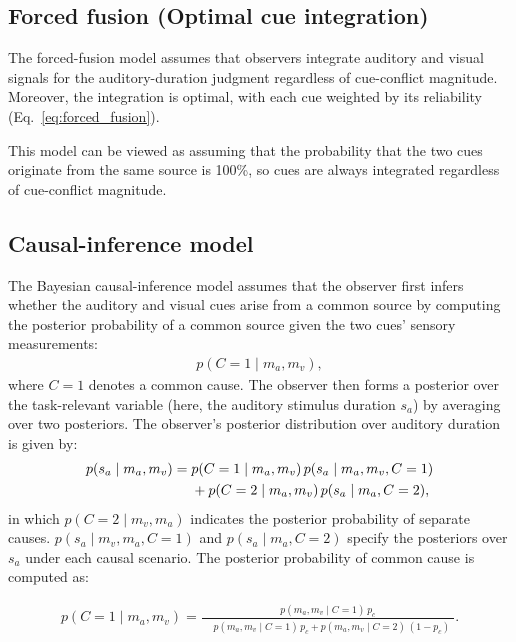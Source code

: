 \documentclass{biorxiv}
\begin{document}
\subsection{Forced fusion (Optimal cue integration)}
The forced-fusion model assumes that observers integrate auditory and visual signals for the auditory-duration judgment regardless of cue-conflict magnitude. Moreover, the integration is optimal, with each cue weighted by its reliability (Eq.~\ref{eq:forced_fusion}). 

This model can be viewed as assuming that the probability that the two cues originate from the same source is 100\%, so cues are always integrated regardless of cue-conflict magnitude. 

\subsection{Causal-inference model}
The Bayesian causal-inference model assumes that the observer first infers whether the auditory and visual cues arise from a common source by computing the posterior probability of a common source given the two cues' sensory measurements:
\begin{align}
p(C = 1 \mid m_a, m_v),
\label{eq:pc}
\end{align}
where $C = 1$ denotes a common cause. The observer then forms a posterior over the task-relevant variable (here, the auditory stimulus duration $s_a$) by averaging over two posteriors. The observer's posterior distribution over auditory duration is given by:
\begin{align}
p(s_a \mid m_a, m_v)
= {}& p(C = 1 \mid m_a, m_v)\,
      p(s_a \mid m_a, m_v,C=1) \notag\\
&+ p(C = 2 \mid m_a, m_v)\,
   p(s_a \mid m_a,C=2),
\label{eq:auditory_bimodal_estimate}
\end{align}
in which $p(C = 2 \mid m_v, m_a)$ indicates the posterior probability of separate causes. $p(s_a \mid m_v, m_a, C=1)$ and $p(s_a \mid m_a,C=2)$ specify the posteriors over $s_a$ under each causal scenario. The posterior probability of common cause is computed as:

\begin{equation}
\begin{split}
p(C=1 \mid m_a, m_v)
=
\frac{
p(m_a, m_v \mid C=1)\, p_c
}{
\begin{aligned}
&p(m_a, m_v \mid C=1)\, p_c + p(m_a, m_v \mid C=2)\, (1 - p_c)
\end{aligned}
}.
\end{split}
\label{eq:posterior_common_cause}
\end{equation}
\end{document}
